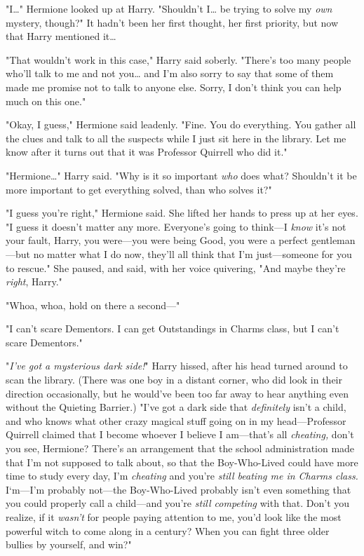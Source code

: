 "I{\ldots}" Hermione looked up at Harry. "Shouldn't I{\ldots} be trying to
solve my \emph{own} mystery, though?" It hadn't been her first thought, her
first priority, but now that Harry mentioned it{\ldots}

"That wouldn't work in this case," Harry said soberly. "There's too many people
who'll talk to me and not you{\ldots} and I'm also sorry to say that some of
them made me promise not to talk to anyone else. Sorry, I don't think you can
help much on this one."

"Okay, I guess," Hermione said leadenly. "Fine. You do everything. You gather
all the clues and talk to all the suspects while I just sit here in the
library. Let me know after it turns out that it was Professor Quirrell who did
it."

"Hermione{\ldots}" Harry said. "Why is it so important \emph{who} does what?
Shouldn't it be more important to get everything solved, than who solves it?"

"I guess you're right," Hermione said. She lifted her hands to press up at her
eyes. "I guess it doesn't matter any more. Everyone's going to think---I
\emph{know} it's not your fault, Harry, you were---you were being Good, you
were a perfect gentleman---but no matter what I do now, they'll all think that
I'm just---someone for you to rescue." She paused, and said, with her voice
quivering, "And maybe they're \emph{right}, Harry."

"Whoa, whoa, hold on there a second---"

"I can't scare Dementors. I can get Outstandings in Charms class, but I can't
scare Dementors."

"\emph{I've got a mysterious dark side!}" Harry hissed, after his head turned
around to scan the library. (There was one boy in a distant corner, who did
look in their direction occasionally, but he would've been too far away to hear
anything even without the Quieting Barrier.) "I've got a dark side that
\emph{definitely} isn't a child, and who knows what other crazy magical stuff
going on in my head---Professor Quirrell claimed that I become whoever I
believe I am---that's all \emph{cheating,} don't you see, Hermione? There's an
arrangement that the school administration made that I'm not supposed to talk
about, so that the Boy-Who-Lived could have more time to study every day, I'm
\emph{cheating} and you're \emph{still beating me in Charms class.} I`m---I'm
probably not---the Boy-Who-Lived probably isn't even something that you could
properly call a child---and you're \emph{still competing} with that. Don't you
realize, if it \emph{wasn't} for people paying attention to me, you'd look like
the most powerful witch to come along in a century? When you can fight three
older bullies by yourself, and win?"

